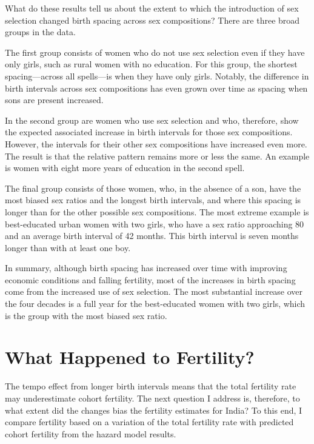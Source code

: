 \documentclass[12pt,letterpaper]{article}
\begin{document}
What do these results tell us about the extent to which the introduction of sex selection 
changed birth spacing across sex compositions? 
There are three broad groups in the data.

The first group consists of women who do not use sex selection even if they have only 
girls, such as rural women with no education. 
For this group, the shortest spacing---across all spells---is when they have only girls. 
Notably, the difference in birth intervals across sex compositions has even grown over 
time as spacing when sons are present increased.

In the second group are women who use sex selection and who, therefore, show the expected 
associated increase in birth intervals for those sex compositions. 
However, the intervals for their other sex compositions have increased even more. 
The result is that the relative pattern remains more or less the same. 
An example is women with eight more years of education in the second spell.

The final group consists of those women, who, in the absence of a son, have the most 
biased sex ratios and the longest birth intervals, and where this spacing is longer than 
for the other possible sex compositions. 
The most extreme example is best-educated urban women with two girls, who have a sex ratio 
approaching 80 and an average birth interval of 42 months. 
This birth interval is seven months longer than with at least one boy.

In summary, although birth spacing has increased over time with improving economic 
conditions and falling fertility, most of the increases in birth spacing come from the
increased use of sex selection. 
The most substantial increase over the four decades is a full year for the best-educated 
women with two girls, which is the group with the most biased sex ratio.



\section{What Happened to Fertility?\label{sec:fertility}}

The tempo effect from longer birth intervals means that the total fertility rate may 
underestimate cohort fertility. 
The next question I address is, therefore, to what extent did the changes bias the 
fertility estimates for India? 
To this end, I compare fertility based on a variation of the total fertility rate with 
predicted cohort fertility from the hazard model results.
\end{document}
